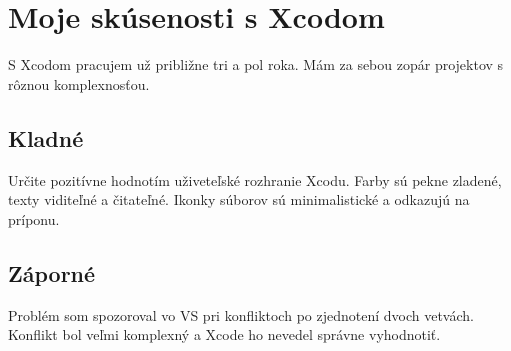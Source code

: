 \documentclass[12pt]{article}
\begin{document}
	\newpage
		\section{Moje skúsenosti s Xcodom}
			S Xcodom pracujem už približne tri a pol roka.  Mám za sebou zopár projektov s rôznou komplexnosťou. 

		\subsection{Kladné}
			Určite pozitívne hodnotím uživeteľské rozhranie Xcodu.  Farby sú pekne zladené,  texty viditeľné a čitateľné.  Ikonky súborov sú minimalistické a odkazujú na príponu.  \par

		\subsection{Záporné}
			Problém som spozoroval vo VS pri konfliktoch po zjednotení dvoch vetvách.  Konflikt bol veľmi komplexný a Xcode ho nevedel správne 	vyhodnotiť.  \par

	\newpage
		\renewcommand\refname{Referencie}
		{}
		
\end{document}
